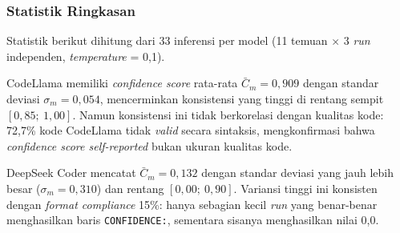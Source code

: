 \subsubsection{Statistik Ringkasan}

\begin{table}[h]
\caption{Statistik lengkap komparasi kelima model LLM pada Kondisi A}
\vspace{0.5em}
\centering
\label{tab:stats-table-a}
\end{table}
Statistik berikut dihitung dari 33 inferensi per model (11 temuan 
$\times$ 3 \textit{run} independen, \textit{temperature} = 0,1).

CodeLlama memiliki \textit{confidence score} rata-rata
$\bar{C}_m = 0{,}909$ dengan standar deviasi $\sigma_m = 0{,}054$,
mencerminkan konsistensi yang tinggi di rentang sempit
$[0{,}85;\ 1{,}00]$. Namun konsistensi ini tidak berkorelasi
dengan kualitas kode: 72,7\% kode CodeLlama tidak \textit{valid}
secara sintaksis, mengkonfirmasi bahwa \textit{confidence score
self-reported} bukan ukuran kualitas kode.

DeepSeek Coder mencatat $\bar{C}_m = 0{,}132$ dengan standar
deviasi yang jauh lebih besar ($\sigma_m = 0{,}310$) dan rentang
$[0{,}00;\ 0{,}90]$. Variansi tinggi ini konsisten dengan
\textit{format compliance} 15\%: hanya sebagian kecil
\textit{run} yang benar-benar menghasilkan baris
\texttt{CONFIDENCE:}, sementara sisanya menghasilkan nilai 0,0.

